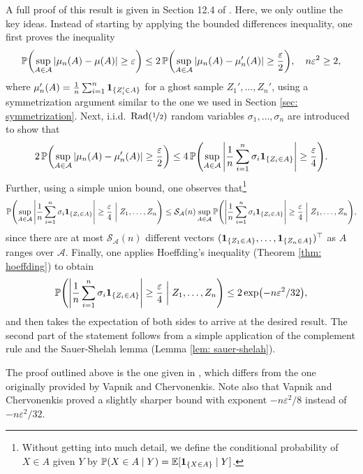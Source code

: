 A full proof of this result is given in Section 12.4 of \cite{devroye1996probabilistic}. Here, we only outline the key ideas. Instead of starting by applying the bounded differences inequality, one first proves the inequality
\[
    \Prob\left(\sup_{A \in \mathcal{A}} \abs{\mu_n(A) - \mu(A)} \geq \varepsilon\right) \leq 2 \Prob\left(\sup_{A \in \mathcal{A}} \abs{\mu_n(A) - \mu_n'(A)} \geq \frac{\varepsilon}{2}\right), \quad n \varepsilon^2 \geq 2,
\]
where $\mu_n'(A) = \frac{1}{n} \sum_{i=1}^n \mathbf{1}_{\{Z_i' \in A\}}$ for a ghost sample $Z_1', \dots, Z_n'$, using a symmetrization argument similar to the one we used in Section \ref{sec: symmetrization}. Next, i.i.d.\ $\operatorname{Rad}(\nicefrac{1}{2})$ random variables $\sigma_1, \dots, \sigma_n$ are introduced to show that
\[
    2 \Prob\left(\sup_{A \in \mathcal{A}} \abs{\mu_n(A) - \mu_n'(A)} \geq \frac{\varepsilon}{2}\right) \leq 4 \Prob\left(\sup_{A \in \mathcal{A}} \abs{\frac{1}{n} \sum_{i=1}^n \sigma_i \indSet{Z_i \in A}} \geq \frac{\varepsilon}{4}\right).
\]
Further, using a simple union bound, one observes that\footnote{Without getting into much detail, we define the conditional probability of $X \in A$ given $Y$ by $\Prob(X \in A \given Y) = \Exp[\indSet{X \in A} \given Y]$.}
\[
    \Prob\left(\sup_{A \in \mathcal{A}} \abs{\frac{1}{n} \sum_{i=1}^n \sigma_i \indSet{Z_i \in A}} \geq \frac{\varepsilon}{4} \given[\bigg] Z_1, \dots, Z_n\right) \leq \mathcal{S}_{\mathcal{A}}(n) \sup_{A \in \mathcal{A}} \Prob\left(\abs{\frac{1}{n} \sum_{i=1}^n \sigma_i \indSet{Z_i \in A}} \geq \frac{\varepsilon}{4} \given[\bigg] Z_1, \dots, Z_n\right),
\]
since there are at most $\mathcal{S}_{\mathcal{A}}(n)$ different vectors $(\indSet{Z_1 \in A}, \dots, \indSet{Z_n \in A})^{\top}$ as $A$ ranges over $\mathcal{A}$. Finally, one applies Hoeffding's inequality (Theorem \ref{thm: hoeffding}) to obtain
\[
    \Prob\left(\abs{\frac{1}{n} \sum_{i=1}^n \sigma_i \indSet{Z_i \in A}} \geq \frac{\varepsilon}{4} \given[\bigg] Z_1, \dots, Z_n\right) \leq 2 \exp(-n\varepsilon^2 / 32),
\]
and then takes the expectation of both sides to arrive at the desired result. The second part of the statement follows from a simple application of the complement rule and the Sauer-Shelah lemma (Lemma \ref{lem: sauer-shelah}).

The proof outlined above is the one given in \cite{devroye1996probabilistic}, which differs from the one originally provided  by Vapnik and Chervonenkis. Note also that Vapnik and Chervonenkis proved a slightly sharper bound with exponent $-n \varepsilon^2 / 8$ instead of $-n \varepsilon^2 / 32$.
